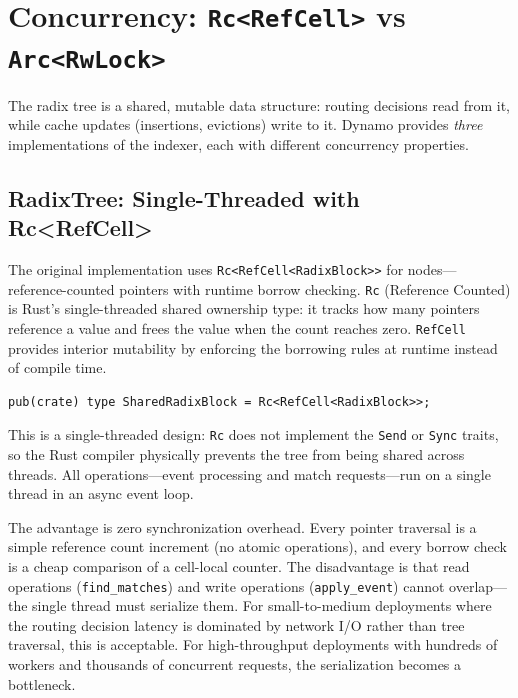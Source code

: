 \section{Concurrency: \texttt{Rc<RefCell>} vs \texttt{Arc<RwLock>}}
\label{sec:kvrouter:concurrency}

%
The radix tree is a shared, mutable data structure: routing decisions read from it, while cache updates (insertions, evictions) write to it. Dynamo provides \emph{three} implementations of the indexer, each with different concurrency properties.

\subsection{RadixTree: Single-Threaded with Rc<RefCell>}

The original implementation uses \texttt{Rc<RefCell<RadixBlock>{}>} for nodes---reference-counted pointers with runtime borrow checking. \texttt{Rc} (Reference Counted) is Rust's single-threaded shared ownership type: it tracks how many pointers reference a value and frees the value when the count reaches zero. \texttt{RefCell} provides interior mutability by enforcing the borrowing rules at runtime instead of compile time.

\begin{verbatim}
pub(crate) type SharedRadixBlock = Rc<RefCell<RadixBlock>>;
\end{verbatim}

This is a single-threaded design: \texttt{Rc} does not implement the \texttt{Send} or \texttt{Sync} traits, so the Rust compiler physically prevents the tree from being shared across threads. All operations---event processing and match requests---run on a single thread in an async event loop.

The advantage is zero synchronization overhead. Every pointer traversal is a simple reference count increment (no atomic operations), and every borrow check is a cheap comparison of a cell-local counter. The disadvantage is that read operations (\texttt{find\_matches}) and write operations (\texttt{apply\_event}) cannot overlap---the single thread must serialize them. For small-to-medium deployments where the routing decision latency is dominated by network I/O rather than tree traversal, this is acceptable. For high-throughput deployments with hundreds of workers and thousands of concurrent requests, the serialization becomes a bottleneck.


